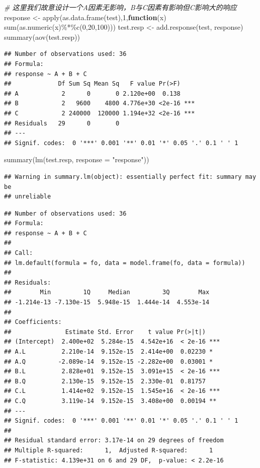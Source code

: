 \documentclass[]{tufte-book}
\newenvironment{Shaded}{}{}
\newcommand{\AttributeTok}[1]{\textcolor[rgb]{0.49,0.56,0.16}{#1}}
\newcommand{\CommentTok}[1]{\textcolor[rgb]{0.38,0.63,0.69}{\textit{#1}}}
\newcommand{\ControlFlowTok}[1]{\textcolor[rgb]{0.00,0.44,0.13}{\textbf{#1}}}
\newcommand{\DecValTok}[1]{\textcolor[rgb]{0.25,0.63,0.44}{#1}}
\newcommand{\FunctionTok}[1]{\textcolor[rgb]{0.02,0.16,0.49}{#1}}
\newcommand{\NormalTok}[1]{#1}
\newcommand{\OtherTok}[1]{\textcolor[rgb]{0.00,0.44,0.13}{#1}}
\newcommand{\SpecialCharTok}[1]{\textcolor[rgb]{0.25,0.44,0.63}{#1}}
\newcommand{\StringTok}[1]{\textcolor[rgb]{0.25,0.44,0.63}{#1}}
\begin{document}
\begin{Shaded}
\begin{Highlighting}[]
\CommentTok{\# 这里我们故意设计一个A因素无影响，B与C因素有影响但C影响大的响应}
\NormalTok{response }\OtherTok{\textless{}{-}} \FunctionTok{apply}\NormalTok{(}\FunctionTok{as.data.frame}\NormalTok{(test),}\DecValTok{1}\NormalTok{,}\ControlFlowTok{function}\NormalTok{(x) }\FunctionTok{sum}\NormalTok{(}\FunctionTok{as.numeric}\NormalTok{(x)}\SpecialCharTok{\%*\%}\FunctionTok{c}\NormalTok{(}\DecValTok{0}\NormalTok{,}\DecValTok{20}\NormalTok{,}\DecValTok{100}\NormalTok{)))}
\NormalTok{test.resp }\OtherTok{\textless{}{-}} \FunctionTok{add.response}\NormalTok{(test, response)}
\FunctionTok{summary}\NormalTok{(}\FunctionTok{aov}\NormalTok{(test.resp))}
\end{Highlighting}
\end{Shaded}

\begin{verbatim}
## Number of observations used: 36 
## Formula:
## response ~ A + B + C
##             Df Sum Sq Mean Sq   F value Pr(>F)    
## A            2      0       0 2.120e+00  0.138    
## B            2   9600    4800 4.776e+30 <2e-16 ***
## C            2 240000  120000 1.194e+32 <2e-16 ***
## Residuals   29      0       0                     
## ---
## Signif. codes:  0 '***' 0.001 '**' 0.01 '*' 0.05 '.' 0.1 ' ' 1
\end{verbatim}

\begin{Shaded}
\begin{Highlighting}[]
\FunctionTok{summary}\NormalTok{(}\FunctionTok{lm}\NormalTok{(test.resp, }\AttributeTok{response =} \StringTok{"response"}\NormalTok{))}
\end{Highlighting}
\end{Shaded}

\begin{verbatim}
## Warning in summary.lm(object): essentially perfect fit: summary may be
## unreliable
\end{verbatim}

\begin{verbatim}
## Number of observations used: 36 
## Formula:
## response ~ A + B + C
## 
## Call:
## lm.default(formula = fo, data = model.frame(fo, data = formula))
## 
## Residuals:
##        Min         1Q     Median         3Q        Max 
## -1.214e-13 -7.130e-15  5.948e-15  1.444e-14  4.553e-14 
## 
## Coefficients:
##               Estimate Std. Error    t value Pr(>|t|)    
## (Intercept)  2.400e+02  5.284e-15  4.542e+16  < 2e-16 ***
## A.L          2.210e-14  9.152e-15  2.414e+00  0.02230 *  
## A.Q         -2.089e-14  9.152e-15 -2.282e+00  0.03001 *  
## B.L          2.828e+01  9.152e-15  3.091e+15  < 2e-16 ***
## B.Q          2.130e-15  9.152e-15  2.330e-01  0.81757    
## C.L          1.414e+02  9.152e-15  1.545e+16  < 2e-16 ***
## C.Q          3.119e-14  9.152e-15  3.408e+00  0.00194 ** 
## ---
## Signif. codes:  0 '***' 0.001 '**' 0.01 '*' 0.05 '.' 0.1 ' ' 1
## 
## Residual standard error: 3.17e-14 on 29 degrees of freedom
## Multiple R-squared:      1,  Adjusted R-squared:      1 
## F-statistic: 4.139e+31 on 6 and 29 DF,  p-value: < 2.2e-16
\end{verbatim}
\end{document}

